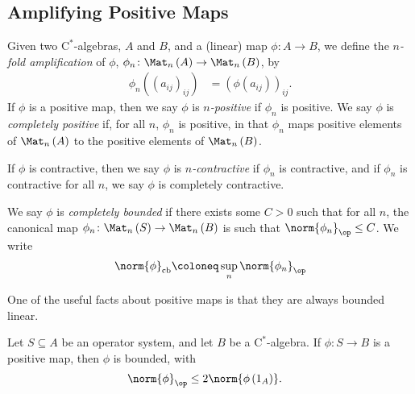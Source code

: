\subsection{Amplifying Positive Maps}%
\begin{definition}
  Given two $\mathrm{C}^{\ast}$-algebras, $A$ and $B$, and a (linear) map $\phi\colon A\rightarrow B$, we define the \textit{$n$-fold amplification} of $\phi$, $\phi_n\colon \Mat_n\left( A \right)\rightarrow \Mat_n\left( B \right)$, by
  \begin{align*}
    \phi_n\left( \left( a_{ij} \right)_{ij} \right) &= \left( \phi\left( a_{ij} \right) \right)_{ij}.
  \end{align*}
  If $\phi$ is a positive map, then we say $\phi$ is \textit{$n$-positive} if $\phi_n$ is positive. We say $\phi$ is \textit{completely positive} if, for all $n$, $\phi_n$ is positive, in that $\phi_n$ maps positive elements of $\Mat_n\left( A \right)$ to the positive elements of $\Mat_n\left( B \right)$.\newline

  If $\phi$ is contractive, then we say $\phi$ is \textit{$n$-contractive} if $\phi_n$ is contractive, and if $\phi_n$ is contractive for all $n$, we say $\phi$ is completely contractive.\newline

  We say $\phi$ is \textit{completely bounded} if there exists some $C > 0$ such that for all $n$, the canonical map $\phi_n\colon \Mat_n\left( S \right)\rightarrow \Mat_n\left( B \right)$ is such that $\norm{\phi_n}_{\op}\leq C$. We write
  \begin{align*}
    \norm{\phi}_{\cb}\coloneq \sup_{n} \norm{\phi_n}_{\op}
  \end{align*}
\end{definition}
One of the useful facts about positive maps is that they are always bounded linear.
\begin{proposition}
  Let $S\subseteq A$ be an operator system, and let $B$ be a $\mathrm{C}^{\ast}$-algebra. If $\phi\colon S\rightarrow B$ is a positive map, then $\phi$ is bounded, with
  \begin{align*}
    \norm{\phi}_{\op} &\leq 2\norm{\phi\left( 1_A \right)}.
  \end{align*}
\end{proposition}
